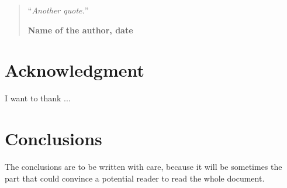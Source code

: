 \documentclass[11pt,a4paper,oneside]{book}
\theoremstyle{definition}
\theoremstyle{remark}
\theoremstyle{plain}
\numberwithin{theorem}{section}
\begin{document}
\medskip

\begin{quotation}
\noindent ``\emph{Another quote.}''
\begin{flushright}\textbf{Name of the author, date}\end{flushright}
\end{quotation}
\chapter*{Acknowledgment}
\thispagestyle{empty}

\noindent I want to thank ...

\thispagestyle{empty}
\setcounter{page}{0}
\tableofcontents
\mainmatter
\setcounter{page}{1}








\chapter*{Conclusions}

The conclusions are to be written with care, because it will be sometimes the part that could convince a potential reader to read the whole document.





\backmatter

\printindex %




\listoftodos
\end{document}
